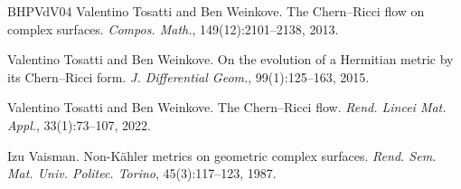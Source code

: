 \documentclass[12pt]{amsart}
\numberwithin{equation}{section}
\theoremstyle{remark}
\theoremstyle{definition}
\begin{document}
\begin{thebibliography}{BHPVdV04}
Valentino Tosatti and Ben Weinkove.
\newblock The Chern--Ricci flow on complex surfaces.
\newblock \emph{Compos. Math.}, 149(12):2101--2138, 2013.

Valentino Tosatti and Ben Weinkove.
\newblock On the evolution of a Hermitian metric by its Chern--Ricci form.
\newblock \emph{J. Differential Geom.}, 99(1):125--163, 2015.

Valentino Tosatti and Ben Weinkove.
\newblock The Chern--Ricci flow.
\newblock \emph{Rend. Lincei Mat. Appl.}, 33(1):73--107, 2022.

Izu Vaisman.
\newblock Non-K\"ahler metrics on geometric complex surfaces.
\newblock \emph{Rend. Sem. Mat. Univ. Politec. Torino}, 45(3):117--123, 1987.

\end{thebibliography}
\end{document}
